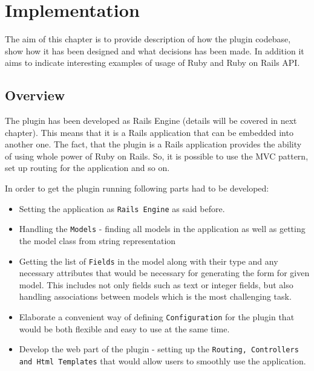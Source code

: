 
\chapter{Implementation}
  The aim of this chapter is to provide description of how the plugin codebase,
  show how it has been designed and what decisions has been made. In addition it aims to indicate
  interesting examples of usage of Ruby and Ruby on Rails API.
  
  \section{Overview}
    The plugin has been developed as Rails Engine (details will be covered in next chapter). This
    means that it is a Rails application that can be embedded into another one. The fact, that 
    the plugin is a Rails application provides the ability of using whole power of Ruby on Rails.
    So, it is possible to use the MVC pattern, set up routing for the application and so on.
    
    In order to get the plugin running following parts had to be developed:
    \begin{itemize}
      \item Setting the application as \texttt{Rails Engine} as said before.
      \item Handling the \texttt{Models} - finding all models in the application as well as
        getting the model class from string representation
      \item Getting the list of \texttt{Fields} in the model along with their type and any
        necessary attributes that would be necessary for generating the form for given model.
        This includes not only fields such as text or integer fields, but also handling associations
        between models which is the most challenging task.
      \item Elaborate a convenient way of defining \texttt{Configuration} for the plugin that would be both flexible
        and easy to use at the same time.
      \item Develop the web part of the plugin - setting up the \texttt{Routing, Controllers and Html Templates} that 
        would allow users to smoothly use the application.
    \end{itemize}
    
